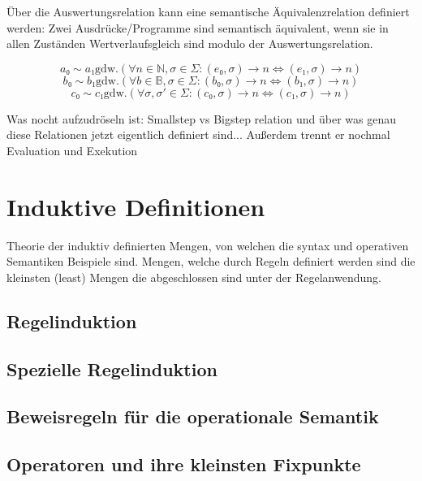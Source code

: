 \documentclass{scrartcl}
\begin{document}
\begin{remark}
Über die Auswertungsrelation kann eine semantische Äquivalenzrelation definiert
werden:
Zwei Ausdrücke/Programme sind semantisch äquivalent, wenn sie in allen Zuständen
Wertverlaufsgleich sind modulo der Auswertungsrelation.

$$a₀ \sim a₁ \text{gdw.} (∀ n ∈ ℕ, σ ∈ Σ: (e₀,σ) → n ⇔ (e₁,σ) → n) $$
$$b₀ \sim b₁ \text{gdw.} (∀ b ∈ 𝔹, σ ∈ Σ: (b₀,σ) → n ⇔ (b₁,σ) → n) $$
$$c₀ \sim c₁ \text{gdw.} (∀ σ, σ' ∈ Σ: (c₀,σ) → n ⇔ (c₁,σ) → n) $$

\end{remark}

\begin{todo}
Was nocht aufzudröseln ist: Smallstep vs Bigstep relation und über was genau
diese Relationen jetzt eigentlich definiert sind...
Außerdem trennt er nochmal Evaluation und Exekution
\end{todo}


\section{Induktive Definitionen}

Theorie der induktiv definierten Mengen,
von welchen die syntax und operativen Semantiken Beispiele sind.
Mengen, welche durch Regeln definiert werden sind die kleinsten (least)
Mengen die abgeschlossen sind unter der Regelanwendung.

\subsection{Regelinduktion}

\subsection{Spezielle Regelinduktion}

\subsection{Beweisregeln für die operationale Semantik}

\subsection{Operatoren und ihre kleinsten Fixpunkte}
\end{document}
